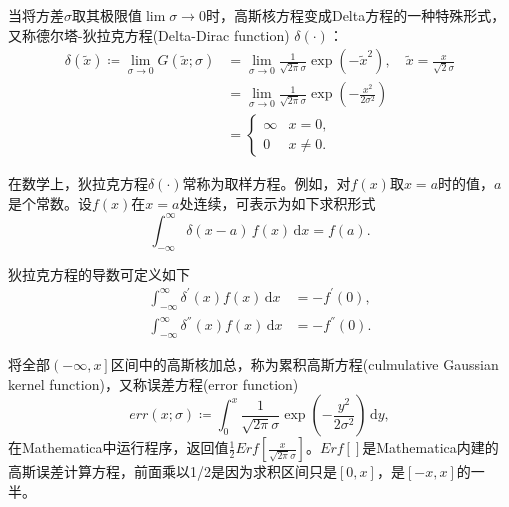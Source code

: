 \begin{subappendices}
当将方差$\sigma$取其极限值$\lim \sigma \rightarrow 0$时，高斯核方程变成Delta方程的一种特殊形式，又称德尔塔-狄拉克方程(Delta-Dirac function) $\delta(\cdot)$：
\begin{equation}
  \label{eq:kernel-gaussian-dirac-def}
\begin{split}
  \delta \left( \tilde{x} \right) \coloneqq \lim_{\sigma \rightarrow 0} G(\tilde{x}; \sigma) & = \lim_{\sigma \rightarrow 0} \frac{1}{\sqrt{2 \pi} \sigma}
  \exp \left( - \tilde{x}^{2} \right), \quad \tilde{x} = \frac{x}{\sqrt{2} \sigma} \\
  & = \lim_{\sigma \rightarrow 0} \frac{1}{\sqrt{2 \pi} \sigma} \exp \left( - \frac{x^{2}}{2 \sigma^{2}} \right) \\
  & = \begin{cases}
  \infty & x =0, \\
  0 & x \neq 0.
  \end{cases}
\end{split}
\end{equation}

在数学上，狄拉克方程$\delta \left( \cdot \right)$常称为取样方程。例如，对$f(x)$取$x=a$时的值，$a$是个常数。设$f(x)$在$x=a$处连续，可表示为如下求积形式
\begin{equation*}
  \int_{-\infty}^{\infty} \delta \left( x - a \right) \, f(x) \, \mathrm{d} x = f \left( a \right).
\end{equation*}

狄拉克方程的导数可定义如下
\begin{equation}
  \label{eq:kernel-gaussian-dirac-derivatives}
  \begin{split}
    \int_{-\infty}^{\infty} \delta^{'} (x) f(x) \, \mathrm{d} x & = - f^{'}(0),
    \\
    \int_{-\infty}^{\infty} \delta^{''} (x) f(x) \, \mathrm{d} x & = - f^{''}(0).
  \end{split}
\end{equation}

将全部$\left( -\infty, x \right]$区间中的高斯核加总，称为累积高斯方程(culmulative Gaussian kernel function)，又称误差方程(error function)
\begin{equation}
  \label{eq:kernel-gaussian-culmulative}
  err \left( x; \sigma \right) \coloneqq \int_{0}^{x} \frac{1}{\sqrt{2 \pi} \sigma} \exp \left( - \frac{y^{2}}{2 \sigma^{2}}\right) \, \mathrm{d} y,
\end{equation}
在Mathematica中运行程序，返回值$\frac{1}{2} Erf\left[ \frac{x}{\sqrt{2 \pi} \sigma} \right]$。$Erf[]$是Mathematica内建的高斯误差计算方程，前面乘以1/2是因为求积区间只是$[0,x]$，是$[-x,x]$的一半。


\end{subappendices}
